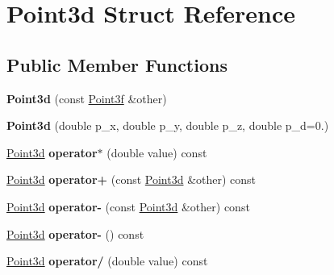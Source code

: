 \hypertarget{struct_point3d}{}\section{Point3d Struct Reference}
\label{struct_point3d}
\subsection*{Public Member Functions}
\begin{DoxyCompactItemize}
\item 
\mbox{\label{struct_point3d_a1de989dba72d4b2f1b125d472c6e0238}} 
{\bfseries Point3d} (const \mbox{\hyperlink{struct_point3f}{Point3f}} \&other)
\item 
\mbox{\label{struct_point3d_ac6dbbcab32632b38014273d99d7a30bd}} 
{\bfseries Point3d} (double p\+\_\+x, double p\+\_\+y, double p\+\_\+z, double p\+\_\+d=0.)
\item 
\mbox{\label{struct_point3d_a7e4a67ef61dc95cfb99f63bc32a7c036}} 
\mbox{\hyperlink{struct_point3d}{Point3d}} {\bfseries operator$\ast$} (double value) const
\item 
\mbox{\label{struct_point3d_a25cdad9739fd3e001c513b292b79744e}} 
\mbox{\hyperlink{struct_point3d}{Point3d}} {\bfseries operator+} (const \mbox{\hyperlink{struct_point3d}{Point3d}} \&other) const
\item 
\mbox{\label{struct_point3d_af6b828bb30bf1269d8dc8cd3a555a893}} 
\mbox{\hyperlink{struct_point3d}{Point3d}} {\bfseries operator-\/} (const \mbox{\hyperlink{struct_point3d}{Point3d}} \&other) const
\item 
\mbox{\label{struct_point3d_adb9c1bcd2c0ec541939cafc9b295c27f}} 
\mbox{\hyperlink{struct_point3d}{Point3d}} {\bfseries operator-\/} () const
\item 
\mbox{\label{struct_point3d_a24269a03d6217778b58dbfd6b4b9b1e7}} 
\mbox{\hyperlink{struct_point3d}{Point3d}} {\bfseries operator/} (double value) const
\end{DoxyCompactItemize}
